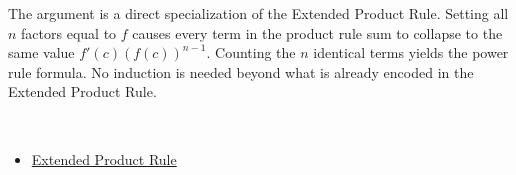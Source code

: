 \begin{remark*}
The argument is a direct specialization of the Extended Product Rule. Setting all $n$ factors equal to $f$ causes every term in the product rule sum to collapse to the same value $f'(c)(f(c))^{n-1}$. Counting the $n$ identical terms yields the power rule formula. No induction is needed beyond what is already encoded in the Extended Product Rule.
\end{remark*}

\begin{remark*}[Dependencies]~\\
\begin{itemize}
  \item \hyperref[cor:extended-product-rule]{Extended Product Rule}
\end{itemize}
\end{remark*}